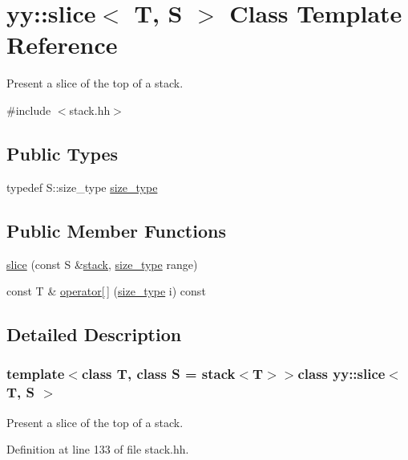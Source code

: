 \hypertarget{classyy_1_1slice}{\section{yy\-:\-:slice$<$ T, S $>$ Class Template Reference}
\label{classyy_1_1slice}
}


Present a slice of the top of a stack.  




{\ttfamily \#include $<$stack.\-hh$>$}

\subsection*{Public Types}
\begin{DoxyCompactItemize}
\item 
typedef S\-::size\-\_\-type \hyperlink{classyy_1_1slice_a9f09083b70527806bb0421c794ac4760}{size\-\_\-type}
\end{DoxyCompactItemize}
\subsection*{Public Member Functions}
\begin{DoxyCompactItemize}
\item 
\hyperlink{classyy_1_1slice_ab9cc1874cb855236b6050444c910867c}{slice} (const S \&\hyperlink{classyy_1_1stack}{stack}, \hyperlink{classyy_1_1slice_a9f09083b70527806bb0421c794ac4760}{size\-\_\-type} range)
\item 
const T \& \hyperlink{classyy_1_1slice_af74e378801d85387b736323801ebf4be}{operator\mbox{[}$\,$\mbox{]}} (\hyperlink{classyy_1_1slice_a9f09083b70527806bb0421c794ac4760}{size\-\_\-type} i) const 
\end{DoxyCompactItemize}


\subsection{Detailed Description}
\subsubsection*{template$<$class T, class S = stack$<$\-T$>$$>$class yy\-::slice$<$ T, S $>$}

Present a slice of the top of a stack. 

Definition at line 133 of file stack.\-hh.



